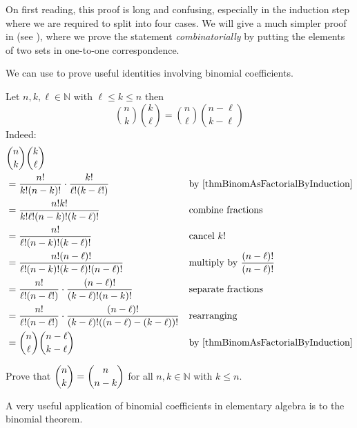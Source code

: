 On first reading, this proof is long and confusing, especially in the induction step where we are required to split into four cases. We will give a much simpler proof in  (see ), where we prove the statement \textit{combinatorially} by putting the elements of two sets in one-to-one correspondence.

We can use  to prove useful identities involving binomial coefficients.

\begin{example}
Let $n,k,\ell \in \mathbb{N}$ with $\ell \le k \le n$ then \[ \binom{n}{k}\binom{k}{\ell} = \binom{n}{\ell}\binom{n-\ell}{k-\ell} \]
Indeed:
\begin{align*}
& \binom{n}{k} \binom{k}{\ell} && \\
&= \frac{n!}{k!(n-k)!} \cdot \frac{k!}{\ell!(k-\ell!)} && \text{by \Cref{thmBinomAsFactorialByInduction}} \\
&= \frac{n!k!}{k!\ell!(n-k)!(k-\ell)!} && \text{combine fractions} \\
&= \frac{n!}{\ell!(n-k)!(k-\ell)!} && \text{cancel } k!\\
&= \frac{n!(n-\ell)!}{\ell!(n-k)!(k-\ell)!(n-\ell)!} && \text{multiply by } \frac{(n-\ell)!}{(n-\ell)!} \\
&= \frac{n!}{\ell!(n-\ell!)} \cdot \frac{(n-\ell)!}{(k-\ell)!(n-k)!} && \text{separate fractions} \\
&= \frac{n!}{\ell!(n-\ell!)} \cdot \frac{(n-\ell)!}{(k-\ell)!((n-\ell)-(k-\ell))!} && \text{rearranging} \\
&= \binom{n}{\ell} \binom{n-\ell}{k-\ell} && \text{by \Cref{thmBinomAsFactorialByInduction}}
\end{align*}
\end{example}

\begin{exercise}
Prove that $\dbinom{n}{k} = \dbinom{n}{n-k}$ for all $n,k \in \mathbb{N}$ with $k \le n$.
\end{exercise}

A very useful application of binomial coefficients in elementary algebra is to the binomial theorem.

